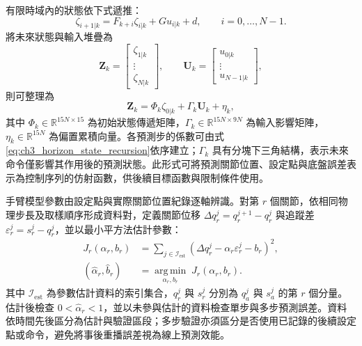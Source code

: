 有限時域內的狀態依下式遞推：
\begin{equation}
    \zeta_{i+1|k}
    =F_{k+i}\zeta_{i|k}+G u_{i|k}+d,
    \qquad i=0,\ldots,N-1.
    \label{eq:ch3_horizon_state_recursion}
\end{equation}
將未來狀態與輸入堆疊為
\begin{equation}
    \mathbf{Z}_k=
    \begin{bmatrix}
        \zeta_{1|k} \\ \vdots \\ \zeta_{N|k}
    \end{bmatrix},
    \qquad
    \mathbf{U}_k=
    \begin{bmatrix}
        u_{0|k} \\ \vdots \\ u_{N-1|k}
    \end{bmatrix},
    \label{eq:ch3_horizon_state_input_stack}
\end{equation}
則可整理為
\begin{equation}
    \mathbf{Z}_k
    =\Phi_k\zeta_{0|k}+\Gamma_k\mathbf{U}_k+\eta_k,
    \label{eq:ch3_condensed_augmented_prediction}
\end{equation}
其中 $\Phi_k\in\mathbb{R}^{15N\times15}$ 為初始狀態傳遞矩陣，$\Gamma_k\in\mathbb{R}^{15N\times9N}$ 為輸入影響矩陣，$\eta_k\in\mathbb{R}^{15N}$ 為偏置累積向量。各預測步的係數可由式\eqref{eq:ch3_horizon_state_recursion}依序建立；$\Gamma_k$ 具有分塊下三角結構，表示未來命令僅影響其作用後的預測狀態。此形式可將預測關節位置、設定點與底盤誤差表示為控制序列的仿射函數，供後續目標函數與限制條件使用。

手臂模型參數由設定點與實際關節位置紀錄逐軸辨識。對第 $r$ 個關節，依相同物理步長及取樣順序形成資料對，定義關節位移 $\Delta q_r^{j}=q_r^{j+1}-q_r^{j}$ 與追蹤差 $\varepsilon_r^{j}=s_r^{j}-q_r^{j}$，並以最小平方法估計參數：
\begin{equation}
    \begin{aligned}
        J_r(\alpha_r,b_r)
        &=\sum_{j\in\mathcal{I}_{\mathrm{est}}}
          \left(\Delta q_r^{j}-\alpha_r\varepsilon_r^{j}-b_r\right)^2, \\
        (\hat{\alpha}_r,\hat{b}_r)
        &=\underset{\alpha_r,b_r}{\operatorname{arg\,min}}\;
          J_r(\alpha_r,b_r).
    \end{aligned}
    \label{eq:ch3_arm_parameter_identification}
\end{equation}
其中 $\mathcal{I}_{\mathrm{est}}$ 為參數估計資料的索引集合，$q_r^{j}$ 與 $s_r^{j}$ 分別為 $q_a^{j}$ 與 $s_a^{j}$ 的第 $r$ 個分量。估計後檢查 $0<\hat{\alpha}_r<1$，並以未參與估計的資料檢查單步與多步預測誤差。資料依時間先後區分為估計與驗證區段；多步驗證亦須區分是否使用已記錄的後續設定點或命令，避免將事後重播誤差視為線上預測效能。

